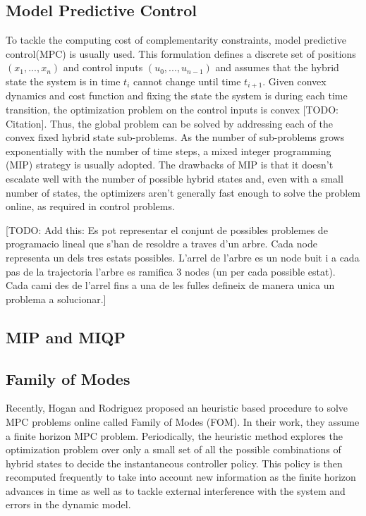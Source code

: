 \documentclass[12,twoside]{TFG-GM}
\theoremstyle{definition}
\theoremstyle{remark}
\begin{document}
\subsection{Model Predictive Control}
\label{subsec:MPC}
To tackle the computing cost of complementarity constraints, model predictive control(MPC) is usually used. This formulation defines a discrete set of positions $(x_1, ..., x_n)$ and control inputs $(u_0, ..., u_{n-1})$ and assumes that the hybrid state the system is in time $t_i$ cannot change until time $t_{i+1}$. Given convex dynamics and cost function and fixing the state the system is during each time transition, the optimization problem on the control inputs is convex [TODO: Citation]. Thus, the global problem can be solved by addressing each of the convex fixed hybrid state sub-problems.
As the number of sub-problems grows exponentially with the number of time steps, a mixed integer programming (MIP) strategy is usually adopted. The drawbacks of MIP is that it doesn't escalate well with the number of possible hybrid states and, even with a small number of states, the optimizers aren't generally fast enough to solve the problem online, as required in control problems.

[TODO: Add this: Es pot representar el conjunt de possibles problemes de programacio lineal que s'han de resoldre a traves d'un arbre. Cada node representa un dels tres estats possibles. L'arrel de l'arbre es un node buit i a cada pas de la trajectoria l'arbre es ramifica 3 nodes (un per cada possible estat). Cada cami des de l'arrel fins a una de les fulles defineix de manera unica un problema a solucionar.]

\subsection{MIP and MIQP}
\label{subsec:intro_miqp}

\subsection{Family of Modes}
\label{subsec:fom}
Recently, Hogan and Rodriguez \cite{fom} proposed an heuristic based procedure to solve MPC problems online called Family of Modes (FOM). In their work, they assume a finite horizon MPC problem. Periodically, the heuristic method explores the optimization problem over only a small set of all the possible combinations of hybrid states to decide the instantaneous controller policy. This policy is then recomputed frequently to take into account new information as the finite horizon advances in time as well as to tackle external interference with the system and errors in the dynamic model.
\end{document}
